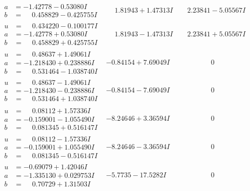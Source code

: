 \documentclass[1p]{elsarticle_modified}
\theoremstyle{definition}
\begin{document}
$$\begin{array}{c|c|c}
\begin{aligned}
a &= -1.42778 - 0.53080 I \\
b &= \phantom{-}0.458829 - 0.425755 I\end{aligned}
 & \phantom{-}1.81943 + 1.47313 I & \phantom{-}2.23841 - 5.05567 I \\ \hline\begin{aligned}
u &= \phantom{-}0.434220 - 0.100177 I \\
a &= -1.42778 + 0.53080 I \\
b &= \phantom{-}0.458829 + 0.425755 I\end{aligned}
 & \phantom{-}1.81943 - 1.47313 I & \phantom{-}2.23841 + 5.05567 I \\ \hline\begin{aligned}
u &= \phantom{-}0.48637 + 1.49061 I \\
a &= -1.218430 + 0.238886 I \\
b &= \phantom{-}0.531464 - 1.038740 I\end{aligned}
 & -0.84154 + 7.69049 I & \phantom{-0.000000 } 0 \\ \hline\begin{aligned}
u &= \phantom{-}0.48637 - 1.49061 I \\
a &= -1.218430 - 0.238886 I \\
b &= \phantom{-}0.531464 + 1.038740 I\end{aligned}
 & -0.84154 - 7.69049 I & \phantom{-0.000000 } 0 \\ \hline\begin{aligned}
u &= \phantom{-}0.08112 + 1.57336 I \\
a &= -0.159001 - 1.055490 I \\
b &= \phantom{-}0.081345 + 0.516147 I\end{aligned}
 & -8.24646 + 3.36594 I & \phantom{-0.000000 } 0 \\ \hline\begin{aligned}
u &= \phantom{-}0.08112 - 1.57336 I \\
a &= -0.159001 + 1.055490 I \\
b &= \phantom{-}0.081345 - 0.516147 I\end{aligned}
 & -8.24646 - 3.36594 I & \phantom{-0.000000 } 0 \\ \hline\begin{aligned}
u &= -0.69079 + 1.42046 I \\
a &= -1.335130 + 0.029753 I \\
b &= \phantom{-}0.70729 + 1.31503 I\end{aligned}
 & -5.7735 - 17.5282 I & \phantom{-0.000000 } 0\\

\end{array}$$
\end{document}
